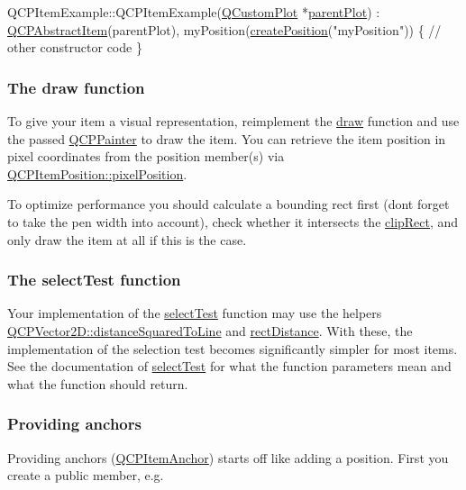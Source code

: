 \begin{DoxyCode}
QCPItemExample::QCPItemExample(\hyperlink{class_q_custom_plot}{QCustomPlot} *\hyperlink{class_q_c_p_layerable_a473edb813a4c1929d6b6a8fe3ff3faf7}{parentPlot}) :
  \hyperlink{class_q_c_p_abstract_item}{QCPAbstractItem}(parentPlot),
  myPosition(\hyperlink{class_q_c_p_abstract_item_a75036d39c4d4e2e1a7dd145fff915d32}{createPosition}(\textcolor{stringliteral}{"myPosition"}))
\{
  \textcolor{comment}{// other constructor code}
\}
\end{DoxyCode}
\hypertarget{class_q_c_p_abstract_item_items-drawing}{}\subsubsection{The draw function}\label{class_q_c_p_abstract_item_items-drawing}
To give your item a visual representation, reimplement the \hyperlink{class_q_c_p_abstract_item_a007fdab79c935a5da5aa04a21d268c18}{draw} function and use the passed \hyperlink{class_q_c_p_painter}{Q\+C\+P\+Painter} to draw the item. You can retrieve the item position in pixel coordinates from the position member(s) via \hyperlink{class_q_c_p_item_position_a8be9a4787635433edecc75164beb748d}{Q\+C\+P\+Item\+Position\+::pixel\+Position}.

To optimize performance you should calculate a bounding rect first (don\textquotesingle{}t forget to take the pen width into account), check whether it intersects the \hyperlink{class_q_c_p_abstract_item_a6ad60000f29afe11035e1f791dcbd45a}{clip\+Rect}, and only draw the item at all if this is the case.\hypertarget{class_q_c_p_abstract_item_items-selection}{}\subsubsection{The select\+Test function}\label{class_q_c_p_abstract_item_items-selection}
Your implementation of the \hyperlink{class_q_c_p_abstract_item_ae41d0349d68bb802c49104afd100ba2a}{select\+Test} function may use the helpers \hyperlink{class_q_c_p_vector2_d_a14840cd3da80cfee4eb3f8977cab89ab}{Q\+C\+P\+Vector2\+D\+::distance\+Squared\+To\+Line} and \hyperlink{class_q_c_p_abstract_item_a7dfc2007e36d09b8b5c988a9f06d6a7e}{rect\+Distance}. With these, the implementation of the selection test becomes significantly simpler for most items. See the documentation of \hyperlink{class_q_c_p_abstract_item_ae41d0349d68bb802c49104afd100ba2a}{select\+Test} for what the function parameters mean and what the function should return.\hypertarget{class_q_c_p_abstract_item_anchors}{}\subsubsection{Providing anchors}\label{class_q_c_p_abstract_item_anchors}
Providing anchors (\hyperlink{class_q_c_p_item_anchor}{Q\+C\+P\+Item\+Anchor}) starts off like adding a position. First you create a public member, e.\+g.


